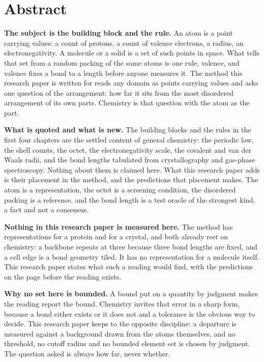 \chapter*{Abstract}

\textbf{The subject is the building block and the rule.} An atom is a point carrying values: a
count of protons, a count of valence electrons, a radius, an electronegativity. A molecule or a
solid is a set of such points in space. What tells that set from a random packing of the same atoms
is one rule, valence, and valence fixes a bond to a length before anyone measures it. The method
this research paper is written for reads any domain as points carrying values and asks one question of the
arrangement: how far it sits from the most disordered arrangement of its own parts. Chemistry is
that question with the atom as the part.

\textbf{What is quoted and what is new.} The building blocks and the rules in the first four
chapters are the settled content of general chemistry: the periodic law, the shell counts, the
octet, the electronegativity scale, the covalent and van der Waals radii, and the bond lengths
tabulated from crystallography and gas-phase spectroscopy. Nothing about them is claimed here. What
this research paper adds is their placement in the method, and the predictions that placement
makes. The atom is a representation, the octet is a screening condition, the disordered packing is a
reference, and the bond length is a test oracle of the strongest kind, a fact and not a consensus.

\textbf{Nothing in this research paper is measured here.} The method has representations for a
protein and for a crystal, and both already rest on chemistry: a backbone repeats at three because
three bond lengths are fixed, and a cell edge is a bond geometry tiled. It has no representation
for a molecule itself. This research paper states what such a reading would find, with the
predictions on the page before the reading exists.

\textbf{Why no set here is bounded.} A bound put on a quantity by judgment makes the reading report
the bound. Chemistry invites that error in a sharp form, because a bond either exists or it does
not and a tolerance is the obvious way to decide. This research paper keeps to the opposite
discipline: a departure is measured against a background drawn from the atoms themselves, and no
threshold, no cutoff radius and no bounded element set is chosen by judgment. The question asked is
always how far, never whether.
